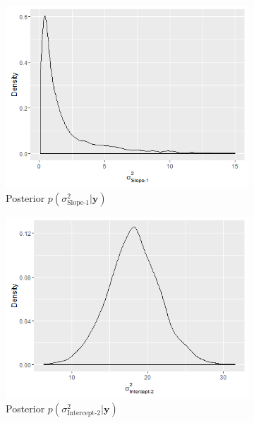 \begin{figure}[!htb]
	\begin{subfigure}[b]{0.4\textwidth}
		\includegraphics[width=\textwidth]{mainmatter/chapter_6_blood_donor/G22_1.png}	
          \caption{\label{fig : cov_blood_donor_22_1}Posterior $p(\sigma^2_\text{Slope-1}| \boldsymbol{y})$}
	\end{subfigure}	
	\begin{subfigure}[b]{0.4\textwidth}
		\includegraphics[width=\textwidth]{mainmatter/chapter_6_blood_donor/G11_2.png}
        \caption{\label{fig : cov_blood_donor_11_2}Posterior $p(\sigma^2_\text{Intercept-2}| \boldsymbol{y})$}
	\end{subfigure}
	\begin{subfigure}[b]{0.4\textwidth}

\end{subfigure}
\end{figure}
